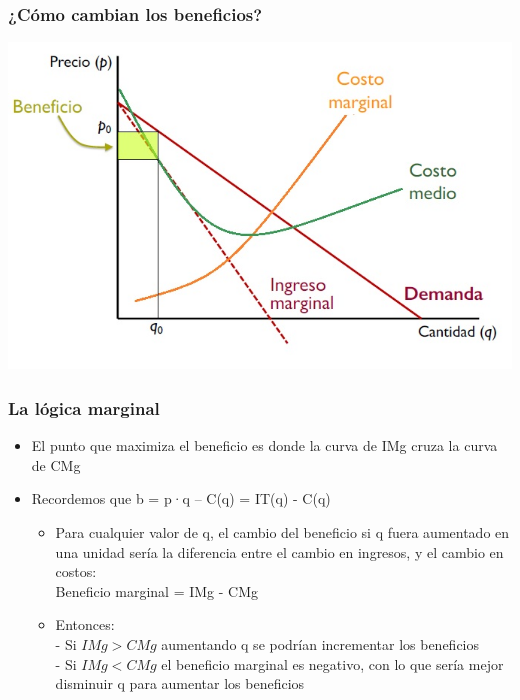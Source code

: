 \documentclass{beamer}
\begin{document}
\begin{frame}
\frametitle{¿Cómo cambian los beneficios?}
\includegraphics[scale=0.6]{Slides Principios de Economia/Figures/Tema_06.34_beneficios.jpg}
\end{frame}


\begin{frame}
\frametitle{La lógica marginal}
\begin{itemize}
    \item El punto que maximiza el beneficio es donde la curva de IMg cruza la curva de CMg\vspace{4mm}
    \item Recordemos que 
    b = p·q – C(q) = IT(q) - C(q)\vspace{2mm}
        \begin{itemize}
        \item Para cualquier valor de q, el cambio del beneficio si q fuera aumentado en una unidad sería la diferencia entre el cambio en ingresos, y el cambio en costos: \vspace{2mm} \\ \hspace{10mm}
    Beneficio marginal = IMg - CMg
        \vspace{2mm} \\
        \item Entonces: \\
            - Si $IMg > CMg$ aumentando q se podrían incrementar los beneficios \\
            - Si $IMg < CMg$ el beneficio marginal es negativo, con lo que sería mejor disminuir q para aumentar los beneficios
    \end{itemize}
    \end{itemize}
\end{frame}
\end{document}
